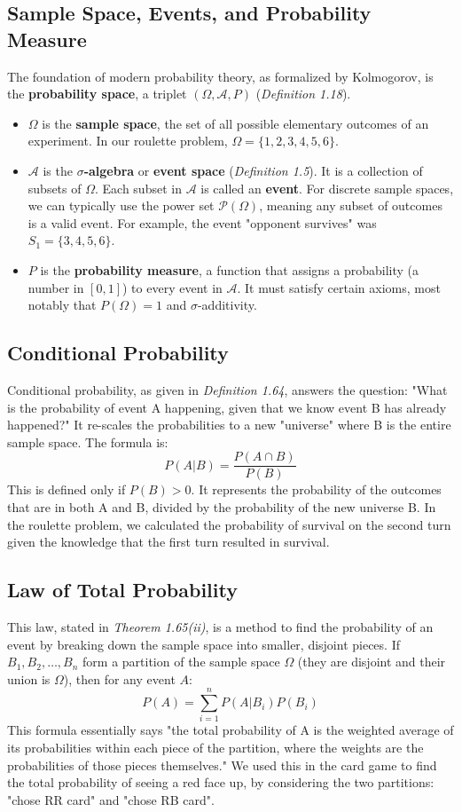 \documentclass[11pt,a4paper]{article}
\theoremstyle{tutorstyle}
\begin{document}
\subsection{Sample Space, Events, and Probability Measure}\label{concept_space}
The foundation of modern probability theory, as formalized by Kolmogorov, is the \textbf{probability space}, a triplet $(\Omega, \mathcal{A}, P)$ (\textit{Definition 1.18}).
\begin{itemize}
    \item $\Omega$ is the \textbf{sample space}, the set of all possible elementary outcomes of an experiment. In our roulette problem, $\Omega = \{1,2,3,4,5,6\}$.
    \item $\mathcal{A}$ is the \textbf{$\sigma$-algebra} or \textbf{event space} (\textit{Definition 1.5}). It is a collection of subsets of $\Omega$. Each subset in $\mathcal{A}$ is called an \textbf{event}. For discrete sample spaces, we can typically use the power set $\mathcal{P}(\Omega)$, meaning any subset of outcomes is a valid event. For example, the event "opponent survives" was $S_1 = \{3,4,5,6\}$.
    \item $P$ is the \textbf{probability measure}, a function that assigns a probability (a number in $[0,1]$) to every event in $\mathcal{A}$. It must satisfy certain axioms, most notably that $P(\Omega)=1$ and $\sigma$-additivity.
\end{itemize}

\subsection{Conditional Probability}\label{concept_condprob}
Conditional probability, as given in \textit{Definition 1.64}, answers the question: "What is the probability of event A happening, given that we know event B has already happened?" It re-scales the probabilities to a new "universe" where B is the entire sample space. The formula is:
\[
P(A | B) = \frac{P(A \cap B)}{P(B)}
\]
This is defined only if $P(B) > 0$. It represents the probability of the outcomes that are in both A and B, divided by the probability of the new universe B. In the roulette problem, we calculated the probability of survival on the second turn given the knowledge that the first turn resulted in survival.

\subsection{Law of Total Probability}\label{concept_totalprob}
This law, stated in \textit{Theorem 1.65(ii)}, is a method to find the probability of an event by breaking down the sample space into smaller, disjoint pieces. If $B_1, B_2, \dots, B_n$ form a partition of the sample space $\Omega$ (they are disjoint and their union is $\Omega$), then for any event $A$:
\[
P(A) = \sum_{i=1}^{n} P(A | B_i) P(B_i)
\]
This formula essentially says "the total probability of A is the weighted average of its probabilities within each piece of the partition, where the weights are the probabilities of those pieces themselves." We used this in the card game to find the total probability of seeing a red face up, by considering the two partitions: "chose RR card" and "chose RB card".
\end{document}

